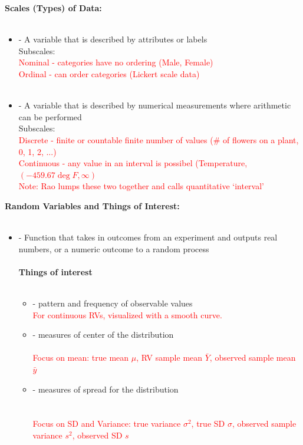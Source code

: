 \newpage

\large \noindent \textbf{Scales (Types) of Data:}\normalsize\\~\\

\begin{itemize}
\item \textcolor{red}{} - A variable that is described by attributes or labels\\
\indent Subscales: \\
\textcolor{red}{Nominal - categories have no ordering (Male, Female)\\
Ordinal - can order categories (Lickert scale data)}\\~\\
\item \textcolor{red}{} - A variable that is described by numerical measurements where arithmetic can be performed\\
\indent Subscales: \\
\textcolor{red}{Discrete - finite or countable finite number of values (\# of flowers on a plant, 0, 1, 2, ...)\\
Continuous - any value in an interval is possibel (Temperature, $(-459.67\deg F, \infty)$\\
Note: Rao lumps these two together and calls quantitative `interval'}
\end{itemize}

\large \noindent \textbf{Random Variables and Things of Interest:}\normalsize\\~\\
\begin{itemize}
\item \textcolor{red}{} - Function that takes in outcomes from an experiment and outputs real numbers, or a numeric outcome to a random process\\~\\
\textbf{Things of interest}\\~\\
\begin{itemize}
\item \textcolor{red}{} - pattern and frequency of observable values\\
\textcolor{red}{For continuous RVs, visualized with a smooth curve.}
\item \textcolor{red}{} - measures of center of the distribution\\~\\
\textcolor{red}{Focus on mean: true mean $\mu$, RV sample mean $\bar{Y}$, observed sample mean $\bar{y}$}
\item \textcolor{red}{} - measures of spread for the distribution\\~\\~\\
\textcolor{red}{Focus on SD and Variance: true variance $\sigma^2$, true SD $\sigma$, observed sample variance $s^2$, observed SD $s$}
\end{itemize}
\end{itemize}

